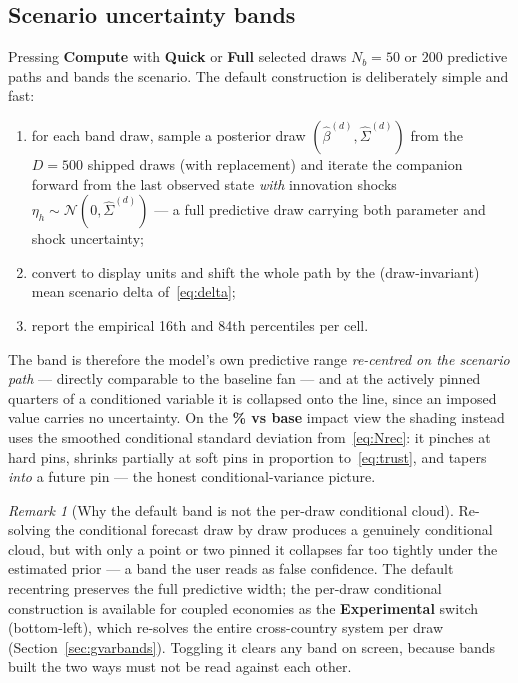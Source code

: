 \documentclass[11pt]{article}
\newcommand{\ui}[1]{\textbf{#1}}
\theoremstyle{plain}
\theoremstyle{remark}
\newtheorem{remark}{Remark}
\begin{document}
\subsection{Scenario uncertainty bands}\label{sec:scenbands}

Pressing \ui{Compute} with \ui{Quick} or \ui{Full} selected draws
$N_b = 50$ or $200$ predictive paths and bands the scenario. The default
construction is deliberately simple and fast:
\begin{enumerate}[label=(\roman*)]
  \item for each band draw, sample a posterior draw
    $(\hat\beta^{(d)}, \hat\Sigma^{(d)})$ from the $D=500$ shipped draws
    (with replacement) and iterate the companion forward from the last
    observed state \emph{with} innovation shocks
    $\eta_h \sim \mathcal{N}(0, \hat\Sigma^{(d)})$ --- a full predictive
    draw carrying both parameter and shock uncertainty;
  \item convert to display units and shift the whole path by the
    (draw-invariant) mean scenario delta of~\eqref{eq:delta};
  \item report the empirical 16th and 84th percentiles per cell.
\end{enumerate}
The band is therefore the model's own predictive range \emph{re-centred
on the scenario path} --- directly comparable to the baseline fan ---
and at the actively pinned quarters of a conditioned variable it is
collapsed onto the line, since an imposed value carries no uncertainty.
On the \ui{\% vs base} impact view the shading instead uses the smoothed
conditional standard deviation from~\eqref{eq:Nrec}: it pinches at hard
pins, shrinks partially at soft pins in proportion
to~\eqref{eq:trust}, and tapers \emph{into} a future pin --- the honest
conditional-variance picture.

\begin{remark}[Why the default band is not the per-draw conditional cloud]\label{rem:bandchoice}
Re-solving the conditional forecast draw by draw produces a genuinely
conditional cloud, but with only a point or two pinned it collapses far
too tightly under the estimated prior --- a band the user reads as
false confidence. The default recentring preserves the full predictive
width; the per-draw conditional construction is available for coupled
economies as the \ui{Experimental} switch (bottom-left), which re-solves
the entire cross-country system per draw
(Section~\ref{sec:gvarbands}). Toggling it clears any band on screen,
because bands built the two ways must not be read against each other.
\end{remark}
\end{document}

